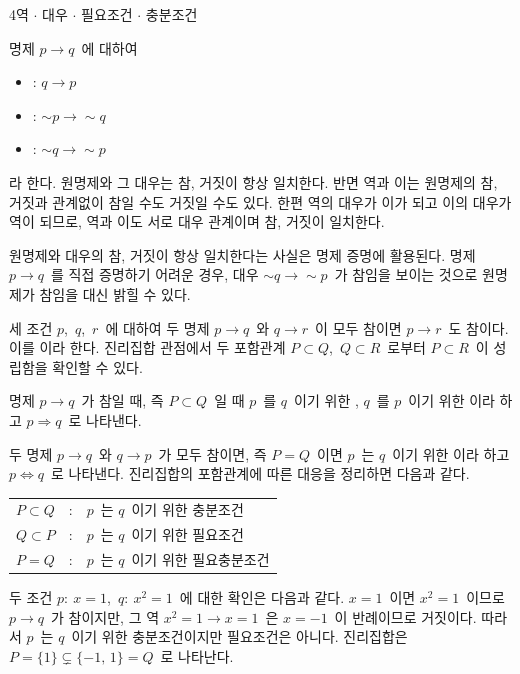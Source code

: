 \documentclass[10pt]{article}
\begin{document}
\begin{dmconcept}{4}{역 $\cdot$ 대우 $\cdot$ 필요조건 $\cdot$ 충분조건}
\setlength{\parskip}{1.8mm plus 1.9mm minus 0mm}\linespread{1.27}\selectfont%


명제 $p \to q$\ 에 대하여
\begin{itemize}[leftmargin=8mm, itemsep=0.4mm, topsep=0.8mm]
  \item {}: $q \to p$
  \item {}: $\sim p \to \sim q$
  \item {}: $\sim q \to \sim p$
\end{itemize}
라 한다. 원명제와 그 대우는 참, 거짓이 항상 일치한다. 반면 역과 이는 원명제의 참, 거짓과 관계없이 참일 수도 거짓일 수도 있다. 한편 역의 대우가 이가 되고 이의 대우가 역이 되므로, 역과 이도 서로 대우 관계이며 참, 거짓이 일치한다.


원명제와 대우의 참, 거짓이 항상 일치한다는 사실은 명제 증명에 활용된다. 명제 $p \to q$\ 를 직접 증명하기 어려운 경우, 대우 $\sim q \to \sim p$\ 가 참임을 보이는 것으로 원명제가 참임을 대신 밝힐 수 있다.


세 조건 $p$,\ $q$,\ $r$\ 에 대하여 두 명제 $p \to q$\ 와 $q \to r$\ 이 모두 참이면 $p \to r$\ 도 참이다. 이를 이라 한다. 진리집합 관점에서 두 포함관계 $P \subset Q$,\ $Q \subset R$\ 로부터 $P \subset R$\ 이 성립함을 확인할 수 있다.


명제 $p \to q$\ 가 참일 때, 즉 $P \subset Q$\ 일 때 $p$\ 를 $q$\ 이기 위한 , $q$\ 를 $p$\ 이기 위한 이라 하고 $p \Rightarrow q$\ 로 나타낸다.

두 명제 $p \to q$\ 와 $q \to p$\ 가 모두 참이면, 즉 $P = Q$\ 이면 $p$\ 는 $q$\ 이기 위한 이라 하고 $p \Longleftrightarrow q$\ 로 나타낸다. 진리집합의 포함관계에 따른 대응을 정리하면 다음과 같다.
\begin{center}
\begin{tabular}{c c l}
$P \subset Q$ & : & $p$\ 는 $q$\ 이기 위한 충분조건 \\[0.4ex]
$Q \subset P$ & : & $p$\ 는 $q$\ 이기 위한 필요조건 \\[0.4ex]
$P = Q$ & : & $p$\ 는 $q$\ 이기 위한 필요충분조건
\end{tabular}
\end{center}

\begin{dmexample}
두 조건 $p:\ x = 1$,\ $q:\ x^{2} = 1$\ 에 대한 확인은 다음과 같다. $x = 1$\ 이면 $x^{2} = 1$\ 이므로 $p \to q$\ 가 참이지만, 그 역 $x^{2} = 1 \to x = 1$\ 은 $x = -1$\ 이 반례이므로 거짓이다. 따라서 $p$\ 는 $q$\ 이기 위한 충분조건이지만 필요조건은 아니다. 진리집합은 $P = \{1\} \subsetneq \{-1,\, 1\} = Q$\ 로 나타난다.
\end{dmexample}

\end{dmconcept}
\end{document}
